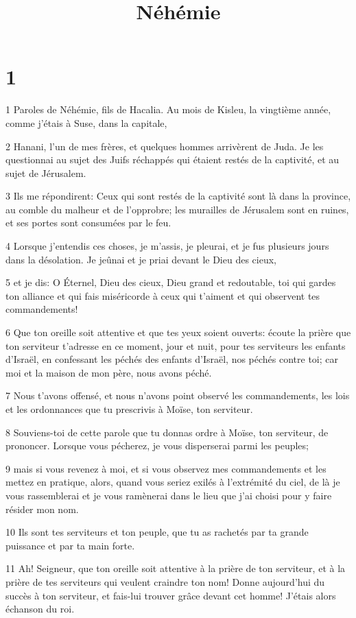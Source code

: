 

\title{Néhémie}


\chapter{1}

\par 1 Paroles de Néhémie, fils de Hacalia. Au mois de Kisleu, la vingtième année, comme j'étais à Suse, dans la capitale,
\par 2 Hanani, l'un de mes frères, et quelques hommes arrivèrent de Juda. Je les questionnai au sujet des Juifs réchappés qui étaient restés de la captivité, et au sujet de Jérusalem.
\par 3 Ils me répondirent: Ceux qui sont restés de la captivité sont là dans la province, au comble du malheur et de l'opprobre; les murailles de Jérusalem sont en ruines, et ses portes sont consumées par le feu.
\par 4 Lorsque j'entendis ces choses, je m'assis, je pleurai, et je fus plusieurs jours dans la désolation. Je jeûnai et je priai devant le Dieu des cieux,
\par 5 et je dis: O Éternel, Dieu des cieux, Dieu grand et redoutable, toi qui gardes ton alliance et qui fais miséricorde à ceux qui t'aiment et qui observent tes commandements!
\par 6 Que ton oreille soit attentive et que tes yeux soient ouverts: écoute la prière que ton serviteur t'adresse en ce moment, jour et nuit, pour tes serviteurs les enfants d'Israël, en confessant les péchés des enfants d'Israël, nos péchés contre toi; car moi et la maison de mon père, nous avons péché.
\par 7 Nous t'avons offensé, et nous n'avons point observé les commandements, les lois et les ordonnances que tu prescrivis à Moïse, ton serviteur.
\par 8 Souviens-toi de cette parole que tu donnas ordre à Moïse, ton serviteur, de prononcer. Lorsque vous pécherez, je vous disperserai parmi les peuples;
\par 9 mais si vous revenez à moi, et si vous observez mes commandements et les mettez en pratique, alors, quand vous seriez exilés à l'extrémité du ciel, de là je vous rassemblerai et je vous ramènerai dans le lieu que j'ai choisi pour y faire résider mon nom.
\par 10 Ils sont tes serviteurs et ton peuple, que tu as rachetés par ta grande puissance et par ta main forte.
\par 11 Ah! Seigneur, que ton oreille soit attentive à la prière de ton serviteur, et à la prière de tes serviteurs qui veulent craindre ton nom! Donne aujourd'hui du succès à ton serviteur, et fais-lui trouver grâce devant cet homme! J'étais alors échanson du roi.

